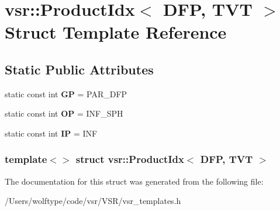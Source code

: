 \hypertarget{structvsr_1_1_product_idx_3_01_d_f_p_00_01_t_v_t_01_4}{\section{vsr\-:\-:Product\-Idx$<$ D\-F\-P, T\-V\-T $>$ Struct Template Reference}
\label{structvsr_1_1_product_idx_3_01_d_f_p_00_01_t_v_t_01_4}
}
\subsection*{Static Public Attributes}
\begin{DoxyCompactItemize}
\item 
\hypertarget{structvsr_1_1_product_idx_3_01_d_f_p_00_01_t_v_t_01_4_a0340cd3e04fdba4584e346b291554a25}{static const int {\bfseries G\-P} = P\-A\-R\-\_\-\-D\-F\-P}\label{structvsr_1_1_product_idx_3_01_d_f_p_00_01_t_v_t_01_4_a0340cd3e04fdba4584e346b291554a25}

\item 
\hypertarget{structvsr_1_1_product_idx_3_01_d_f_p_00_01_t_v_t_01_4_a8aca1fc7ca2d187de20239dcd758e059}{static const int {\bfseries O\-P} = I\-N\-F\-\_\-\-S\-P\-H}\label{structvsr_1_1_product_idx_3_01_d_f_p_00_01_t_v_t_01_4_a8aca1fc7ca2d187de20239dcd758e059}

\item 
\hypertarget{structvsr_1_1_product_idx_3_01_d_f_p_00_01_t_v_t_01_4_a2e872427c49753c06928916e08af70d1}{static const int {\bfseries I\-P} = I\-N\-F}\label{structvsr_1_1_product_idx_3_01_d_f_p_00_01_t_v_t_01_4_a2e872427c49753c06928916e08af70d1}

\end{DoxyCompactItemize}
\subsubsection*{template$<$$>$ struct vsr\-::\-Product\-Idx$<$ D\-F\-P, T\-V\-T $>$}



The documentation for this struct was generated from the following file\-:\begin{DoxyCompactItemize}
\item 
/\-Users/wolftype/code/vsr/\-V\-S\-R/vsr\-\_\-templates.\-h\end{DoxyCompactItemize}
